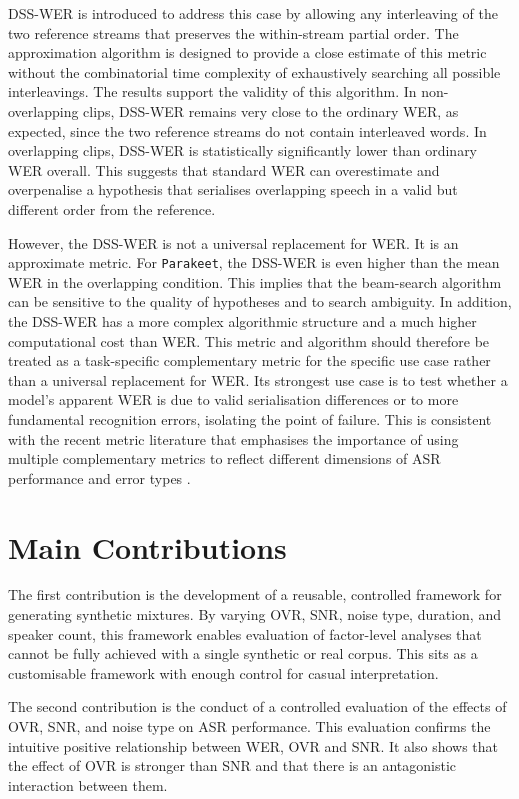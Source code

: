 DSS-WER is introduced to address this case by allowing any interleaving of the two reference streams that preserves the within-stream partial order. The approximation algorithm is designed to provide a close estimate of this metric without the combinatorial time complexity of exhaustively searching all possible interleavings. The results support the validity of this algorithm. In non-overlapping clips, DSS-WER remains very close to the ordinary WER, as expected, since the two reference streams do not contain interleaved words. In overlapping clips, DSS-WER is statistically significantly lower than ordinary WER overall. This suggests that standard WER can overestimate and overpenalise a hypothesis that serialises overlapping speech in a valid but different order from the reference. 

However, the DSS-WER is not a universal replacement for WER. It is an approximate metric. For \texttt{Parakeet}, the DSS-WER is even higher than the mean WER in the overlapping condition. This implies that the beam-search algorithm can be sensitive to the quality of hypotheses and to search ambiguity. In addition, the DSS-WER has a more complex algorithmic structure and a much higher computational cost than WER. This metric and algorithm should therefore be treated as a task-specific complementary metric for the specific use case rather than a universal replacement for WER. Its strongest use case is to test whether a model's apparent WER is due to valid serialisation differences or to more fundamental recognition errors, isolating the point of failure. This is consistent with the recent metric literature that emphasises the importance of using multiple complementary metrics to reflect different dimensions of ASR performance and error types \citep{von_Neumann_2023, vonneumann2024meetevaltoolkitcomputationword, von_Neumann_2025}.

\section{Main Contributions}
The first contribution is the development of a reusable, controlled framework for generating synthetic mixtures. By varying OVR, SNR, noise type, duration, and speaker count, this framework enables evaluation of factor-level analyses that cannot be fully achieved with a single synthetic or real corpus. This sits as a customisable framework with enough control for casual interpretation.

The second contribution is the conduct of a controlled evaluation of the effects of OVR, SNR, and noise type on ASR performance. This evaluation confirms the intuitive positive relationship between WER, OVR and SNR. It also shows that the effect of OVR is stronger than SNR and that there is an antagonistic interaction between them.

